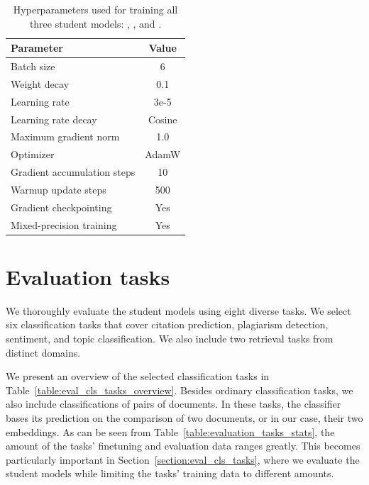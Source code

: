 \begin{table}
  \centering
  \footnotesize

  \begin{tabular}{l c}
    \toprule
    Parameter & Value \\
    \midrule
    Batch size & 6 \\
    Weight decay & 0.1 \\
    Learning rate & 3e-5 \\
    Learning rate decay & Cosine \\
    Maximum gradient norm & 1.0 \\
    Optimizer & AdamW \\
    Gradient accumulation steps & 10 \\
    Warmup update steps & 500\\
    Gradient checkpointing & Yes \\
    Mixed-precision training & Yes \\
    \bottomrule
  \end{tabular}

  \caption{Hyperparameters used for training all three student models:
  {\CosineStudent}, {\MSEStudent}, and {\OnlyMSEStudent}.}

  \label{table:final_student_train_params}

\end{table}

\section{Evaluation tasks}

We thoroughly evaluate the student models using eight diverse tasks. We
select six classification tasks that cover citation prediction, plagiarism
detection, sentiment, and topic classification. We also include two retrieval
tasks from distinct domains.

We present an overview of the selected classification tasks in
Table~\ref{table:eval_cls_tasks_overview}. Besides ordinary classification
tasks, we also include classifications of pairs of documents. In these tasks,
the classifier bases its prediction on the comparison of two documents, or in
our case,  their two embeddings. As can be seen from
Table~\ref{table:evaluation_tasks_stats}, the amount of the tasks' finetuning and evaluation data ranges greatly. This becomes particularly important in
Section~\ref{section:eval_cls_tasks}, where we evaluate the student models
while limiting the tasks' training data to different amounts.

